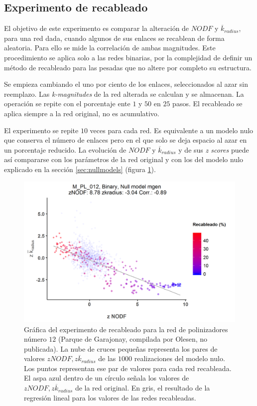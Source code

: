 \subsection{Experimento de recableado}

El objetivo de este experimento es comparar la alteración de $NODF$ y $\overline k_{radius}$, para una red dada, cuando algunos de sus enlaces se recablean de forma aleatoria. Para ello se mide la correlación de ambas magnitudes. Este procedimiento se aplica solo a las redes binarias, por la complejidad de definir un método de recableado para las pesadas que no altere por completo su estructura.

Se empieza cambiando el uno por ciento de los enlaces, seleccionados al azar sin reemplazo. Las \textit{k-magnitudes} de la red alterada se calculan y se almacenan. La operación se repite con el porcentaje ente $1$ y $50$ en $25$ pasos. El recableado se aplica siempre a la red original, no es acumulativo. 

El experimento se repite $10$ veces para cada red. Es equivalente a un modelo nulo que conserva el número de enlaces pero en el que solo se deja espacio al azar en un porcentaje reducido. La evolución de $NODF$ y $\overline k_{radius}$ y de sus \textit{z scores} puede así compararse con los parámetros de la red original y con los del modelo nulo explicado en la sección \ref{sec:nullmodels} (figura \ref{fig:z_M_PL_012_rewire_Binary_ES_model_5}).

\begin{figure}[h!]
\centering
\includegraphics[scale=0.75]{Figures/ESTATICA_z_M_PL_012_rewire_Binary_ES_model_5.png}
\caption {Gráfica del experimento de recableado para la red de polinizadores número $12$ (Parque de Garajonay, compilada por Olesen, no publicada). La nube de cruces pequeñas representa los pares de valores $zNODF,z\overline k_{radius}$ de las $1000$ realizaciones del modelo nulo. Los puntos representan ese par de valores para cada red recableada. El aspa azul dentro de un círculo señala los valores de $zNODF,z\overline k_{radius}$ de la red original. En gris, el resultado de la regresión lineal para los valores de las redes recableadas.}
\label{fig:z_M_PL_012_rewire_Binary_ES_model_5}
\end{figure}

